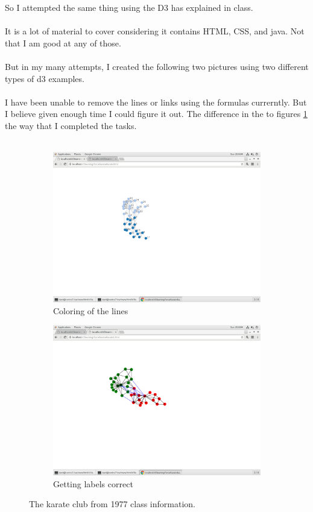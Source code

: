 \documentclass[10pt,letterpaper]{article}
\begin{document}
So I attempted the same thing using the D3 has explained in class.\\
\\
It is a lot of material to cover considering it contains HTML, CSS, and java.  Not that I am good at any of those.\\
\\
But in my many attempts, I created the following two pictures using two different types of d3 examples.\\
\\
I have been unable to remove the lines or links using the formulas currerntly.  But I believe given enough time I could figure it out.  The difference in the to figures \ref{fig:ques2} the way that I completed the tasks.\\
\\
\begin{figure}[H]
  \centering
  \begin{subfigure}[b]{0.4\linewidth}
     \includegraphics[width=\linewidth]{d3karate_html.png} 
     \caption{Coloring of the lines}
  \end{subfigure}  
  \begin{subfigure}[b]{0.4\linewidth}
     \includegraphics[width=\linewidth]{d3karate1_html.png}
     \caption{Getting labels correct}
  \end{subfigure}
  \caption{The karate club from 1977 class information.}
  \label{fig:ques2}
\end{figure}
\end{document}
